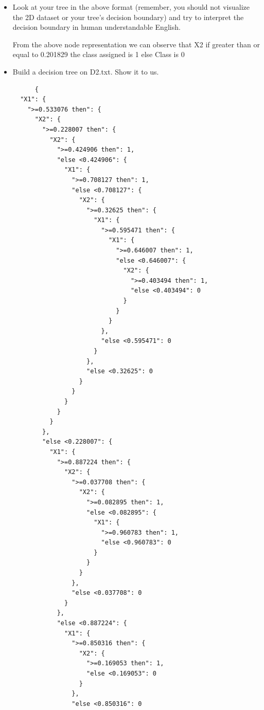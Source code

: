 \documentclass[a4paper]{article}
\theoremstyle{definition}
\newenvironment{soln}{
    \leavevmode\color{blue}\ignorespaces
}{}
\begin{document}
\begin{enumerate}
\begin{itemize}
  \item Look at your tree in the above format (remember, you should not visualize the 2D dataset or your tree's decision boundary) and try to interpret the decision boundary in human understandable English. 

  \begin{soln}
      From the above node representation we can observe that X2 if greater than or equal to 0.201829 the class assigned is 1 else Class is 0
  \end{soln}
  
  \item Build a decision tree on D2.txt.  Show it to us. 
  \begin{soln}
      \begin{lstlisting}
      {
  "X1": {
    ">=0.533076 then": {
      "X2": {
        ">=0.228007 then": {
          "X2": {
            ">=0.424906 then": 1,
            "else <0.424906": {
              "X1": {
                ">=0.708127 then": 1,
                "else <0.708127": {
                  "X2": {
                    ">=0.32625 then": {
                      "X1": {
                        ">=0.595471 then": {
                          "X1": {
                            ">=0.646007 then": 1,
                            "else <0.646007": {
                              "X2": {
                                ">=0.403494 then": 1,
                                "else <0.403494": 0
                              }
                            }
                          }
                        },
                        "else <0.595471": 0
                      }
                    },
                    "else <0.32625": 0
                  }
                }
              }
            }
          }
        },
        "else <0.228007": {
          "X1": {
            ">=0.887224 then": {
              "X2": {
                ">=0.037708 then": {
                  "X2": {
                    ">=0.082895 then": 1,
                    "else <0.082895": {
                      "X1": {
                        ">=0.960783 then": 1,
                        "else <0.960783": 0
                      }
                    }
                  }
                },
                "else <0.037708": 0
              }
            },
            "else <0.887224": {
              "X1": {
                ">=0.850316 then": {
                  "X2": {
                    ">=0.169053 then": 1,
                    "else <0.169053": 0
                  }
                },
                "else <0.850316": 0

\end{lstlisting}
\end{soln}
\end{itemize}
\end{enumerate}
\end{document}
